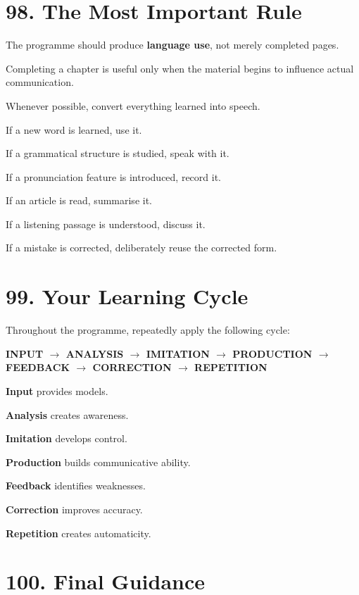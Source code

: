 \section*{98. The Most Important Rule}

The programme should produce \textbf{language use}, not merely completed pages.

Completing a chapter is useful only when the material begins to influence actual communication.

Whenever possible, convert everything learned into speech.

If a new word is learned, use it.

If a grammatical structure is studied, speak with it.

If a pronunciation feature is introduced, record it.

If an article is read, summarise it.

If a listening passage is understood, discuss it.

If a mistake is corrected, deliberately reuse the corrected form.

\section*{99. Your Learning Cycle}

Throughout the programme, repeatedly apply the following cycle:

\begin{center}
\Large
\textbf{INPUT $\rightarrow$ ANALYSIS $\rightarrow$ IMITATION $\rightarrow$ PRODUCTION $\rightarrow$ FEEDBACK $\rightarrow$ CORRECTION $\rightarrow$ REPETITION}
\end{center}

\vspace{0.5cm}

\noindent
\textbf{Input} provides models.

\noindent
\textbf{Analysis} creates awareness.

\noindent
\textbf{Imitation} develops control.

\noindent
\textbf{Production} builds communicative ability.

\noindent
\textbf{Feedback} identifies weaknesses.

\noindent
\textbf{Correction} improves accuracy.

\noindent
\textbf{Repetition} creates automaticity.

\section*{100. Final Guidance}

